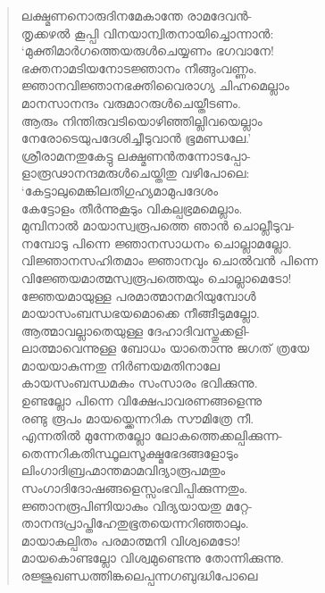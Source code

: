 \begin{verse}
ലക്ഷ്മണനൊരുദിനമേകാന്തേ രാമദേവന്‍-\\
തൃക്കഴല്‍ കൂപ്പി വിനയാന്വിതനായിച്ചൊന്നാന്‍:\\
‘മുക്തിമാര്‍ഗത്തെയരുള്‍ചെയ്യണം ഭഗവാനേ!\\
ഭക്തനാമടിയനോടജ്ഞാനം നീങ്ങുംവണ്ണം.\\
ജ്ഞാനവിജ്ഞാനഭക്തിവൈരാഗ്യ ചിഹ്നമെല്ലാം\\
മാനസാനന്ദം വരുമാറരുള്‍ചെയ്തീടണം.\\
ആരും നിന്തിരുവടിയൊഴിഞ്ഞില്ലിവയെല്ലാം\\
നേരോടെയുപദേശിച്ചീടുവാന്‍ ഭൂമണ്ഡലേ.’\\
ശ്രീരാമനതുകേട്ടു ലക്ഷ്മണന്‍തന്നോടപ്പോ-\\
ളാരൂഢാനന്ദമരുള്‍ചെയ്തിതു വഴിപോലെ:\\
‘കേട്ടാലുമെങ്കിലതിഗുഹ്യമാമുപദേശം\\
കേട്ടോളം തീര്‍ന്നുകൂടും വികല്പഭ്രമമെല്ലാം.\\
മുമ്പിനാല്‍ മായാസ്വരൂപത്തെ ഞാന്‍ ചൊല്ലീടുവ-\\
നമ്പോടു പിന്നെ ജ്ഞാനസാധനം ചൊല്ലാമല്ലോ.\\
വിജ്ഞാനസഹിതമാം ജ്ഞാനവും ചൊല്‍വന്‍ \hbox{പിന്നെ}\\
വിജ്ഞേയമാത്മസ്വരൂപത്തെയും ചൊല്ലാമെടോ!\\
ജ്ഞേയമായുള്ള പരമാത്മാനമറിയുമ്പോള്‍\\
മായാസംബന്ധഭയമൊക്കെ നീങ്ങീടുമല്ലോ.\\
ആത്മാവല്ലാതെയുള്ള ദേഹാദിവസ്തുക്കളി-\\
ലാത്മാവെന്നുള്ള ബോധം യാതൊന്നു ജഗത് ത്രയേ\\
മായയാകുന്നതു നിര്‍ണയമതിനാലേ\\
കായസംബന്ധമകും സംസാരം ഭവിക്കുന്നു.\\
ഉണ്ടല്ലോ പിന്നെ വിക്ഷേപാവരണങ്ങളെന്നു\\
രണ്ടു രൂപം മായയ്ക്കെന്നറിക സൗമിത്രേ നീ.\\
എന്നതില്‍ മുന്നേതല്ലോ ലോകത്തെക്കല്പിക്കുന്ന-\\
തെന്നറികതിസ്ഥൂലസൂക്ഷ്മഭേദങ്ങളോടും\\
ലിംഗാദിബ്രഹ്മാന്തമാമവിദ്യാരൂപമതും\\
സംഗാദിദോഷങ്ങളെസ്സംഭവിപ്പിക്കുന്നതും.\\
ജ്ഞാനരൂപിണിയാകും വിദ്യയായതു മറ്റേ-\\
താനന്ദപ്രാപ്തിഹേതുഭൂതയെന്നറിഞ്ഞാലും.\\
മായാകല്പിതം പരമാത്മനി വിശ്വമെടോ!\\
മായകൊണ്ടല്ലോ വിശ്വമുണ്ടെന്നു തോന്നിക്കുന്നു.\\
രജ്ജുഖണ്ഡത്തിങ്കലെപ്പന്നഗബുദ്ധിപോലെ\\

\end{verse}
